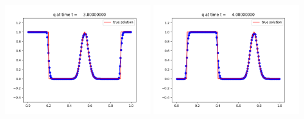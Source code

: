 \documentclass[11pt]{article}
\begin{document}
\vskip 10pt 
\includegraphics[width=0.475\textwidth]{frame0019fig1.png}
\vskip 10pt 
\includegraphics[width=0.475\textwidth]{frame0020fig1.png}
\end{document}
